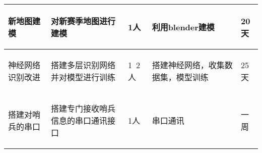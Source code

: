 \begin{longtable}{ p{2cm} | p{3cm} | p{3cm} | p{4.8cm} | p{2cm} |}
    \hline
        \begin{center}
            新地图建模
        \end{center} &
        \begin{center}
            对新赛季地图进行建模
        \end{center} &
        \begin{center}
            1人
        \end{center} &
        \begin{center}
            利用blender建模
        \end{center} &
        \begin{center}
            20天
        \end{center}\\

    \hline
    
        \begin{center}
            神经网络识别改进
        \end{center} &
        \begin{center}
            搭建多层识别网络并对模型进行训练
        \end{center} &
        \begin{center}
            1~2人
        \end{center} &
        \begin{center}
            搭建神经网络，收集数据集，模型训练
        \end{center} &
        \begin{center}
            25天
        \end{center} \\
        
    \hline
    
        \begin{center}
            搭建对哨兵的串口
        \end{center} &
        \begin{center}
            搭建专门接收哨兵信息的串口通讯接口
        \end{center} &
        \begin{center}
            1人
        \end{center} &
        \begin{center}
            串口通讯
        \end{center} &
        \begin{center}
            一周
        \end{center}\\


\end{longtable}
